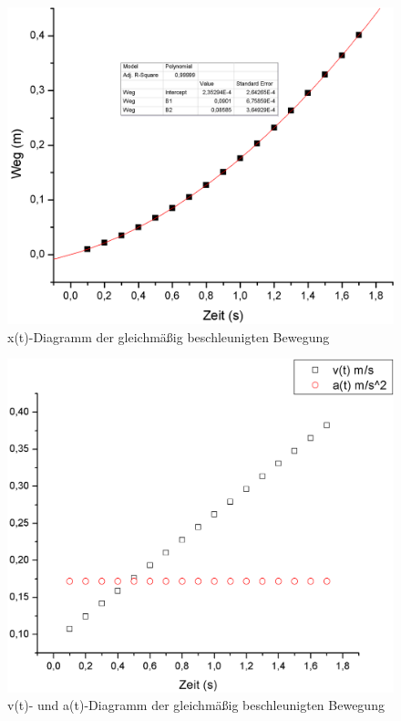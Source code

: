 \documentclass[12pt,a4paper]{article}
\begin{document}
\begin{figure}[H]
	\centering
	\includegraphics[scale=0.53]{./figure/x_t_diagram.png}
	\caption{x(t)-Diagramm der gleichmäßig beschleunigten Bewegung}
	\label{fig:lin_bewegung}
\end{figure}
\begin{figure}[H]
	\centering
	\includegraphics[scale=0.27]{./figure/v_a_t_diagram.png}
	\caption{v(t)- und a(t)-Diagramm der gleichmäßig beschleunigten Bewegung}
	\label{fig:lin_bewegung_v_a}
\end{figure}
\end{document}
